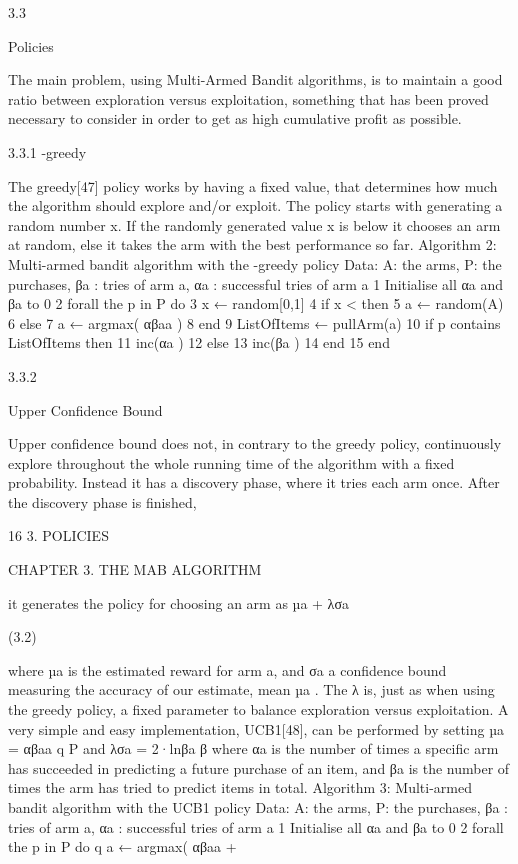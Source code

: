 3.3

Policies

The main problem, using Multi-Armed Bandit algorithms, is to maintain a good ratio
between exploration versus exploitation, something that has been proved necessary to
consider in order to get as high cumulative profit as possible.

3.3.1
-greedy

The greedy[47] policy works by having a fixed value, that determines how much the
algorithm should explore and/or exploit. The policy starts with generating a random
number x. If the randomly generated value x is below it chooses an arm at random,
else it takes the arm with the best performance so far.
Algorithm 2: Multi-armed bandit algorithm with the -greedy policy
Data: A: the arms, P: the purchases, βa : tries of arm a, αa : successful tries of
arm a
1 Initialise all αa and βa to 0
2 forall the p in P do
3
x ← random[0,1]
4
if x < then
5
a ← random(A)
6
else
7
a ← argmax( αβaa )
8
end
9
ListOfItems ← pullArm(a)
10
if p contains ListOfItems then
11
inc(αa )
12
else
13
inc(βa )
14
end
15 end

3.3.2

Upper Confidence Bound

Upper confidence bound does not, in contrary to the greedy policy, continuously explore
throughout the whole running time of the algorithm with a fixed probability. Instead it
has a discovery phase, where it tries each arm once. After the discovery phase is finished,

16
3. POLICIES

CHAPTER 3. THE MAB ALGORITHM

it generates the policy for choosing an arm as
µa + λσa

(3.2)

where µa is the estimated reward for arm a, and σa a confidence bound measuring the
accuracy of our estimate, mean µa . The λ is, just as when using the greedy policy, a
fixed parameter to balance exploration versus exploitation.
A very simple and easy implementation, UCB1[48], can be performed by setting µa = αβaa
q P
and λσa = 2·lnβa β where αa is the number of times a specific arm has succeeded in
predicting a future purchase of an item, and βa is the number of times the arm has tried
to predict items in total.
Algorithm 3: Multi-armed bandit algorithm with the UCB1 policy
Data: A: the arms, P: the purchases, βa : tries of arm a, αa : successful tries of
arm a
1 Initialise all αa and βa to 0
2 forall the p in P do
q
a ← argmax( αβaa +

